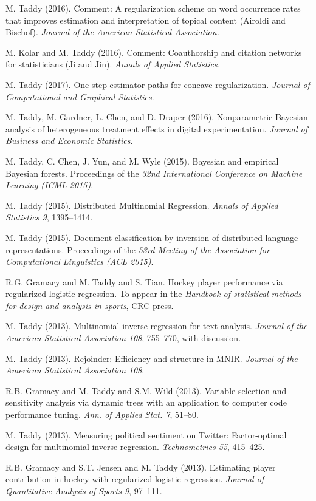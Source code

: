\documentclass[margin,line]{res}
\begin{document}
\begin{resume}
M. Taddy (2016). Comment: A regularization scheme on word occurrence rates that improves estimation and interpretation of topical content (Airoldi and Bischof). {\it Journal of the American Statistical Association.} 

M. Kolar and M. Taddy (2016).  Comment: Coauthorship and citation networks for statisticians (Ji and Jin).  {\it Annals of Applied Statistics. }


M. Taddy (2017). One-step estimator paths for concave regularization.  {\em Journal of Computational and Graphical Statistics}.

M. Taddy, M. Gardner, L. Chen, and D. Draper (2016).  Nonparametric Bayesian analysis of heterogeneous treatment effects in digital experimentation.  {\em Journal of Business and Economic Statistics}.

M. Taddy, C. Chen, J. Yun, and M. Wyle (2015). Bayesian and empirical Bayesian forests.  Proceedings of the {\em 32nd International Conference on Machine Learning (ICML 2015)}.

M. Taddy (2015). Distributed Multinomial Regression.  {\em Annals of Applied Statistics 9}, 1395--1414.

M. Taddy (2015). Document classification by inversion of distributed language representations. Proceedings of the {\em 53rd Meeting of the Association for Computational Linguistics (ACL 2015)}.

R.G. Gramacy and M. Taddy and S. Tian.  Hockey player performance via regularized logistic regression.
To appear in the {\it Handbook of statistical methods for design and analysis in sports}, CRC press.


M. Taddy (2013).  Multinomial inverse regression for text analysis.  
{\it Journal of the American Statistical
  Association 108}, 755--770, with discussion.

M. Taddy (2013).   Rejoinder: Efficiency and structure in MNIR.  {\it Journal of the American Statistical
  Association 108}.




R.B. Gramacy and M. Taddy and S.M. Wild (2013).  Variable selection and
sensitivity analysis via dynamic trees with an application to computer
code performance tuning.  {\it Ann. of Applied
  Stat. 7}, 51--80.

M. Taddy (2013).  Measuring political sentiment on Twitter: Factor-optimal
design for multinomial inverse regression. {\it
  Technometrics 55}, 415--425.


R.B. Gramacy and S.T. Jensen and M. Taddy (2013).  Estimating player contribution in 
hockey with regularized logistic regression. {\it Journal of Quantitative Analysis of Sports 9}, 97--111.


\end{resume}
\end{document}
